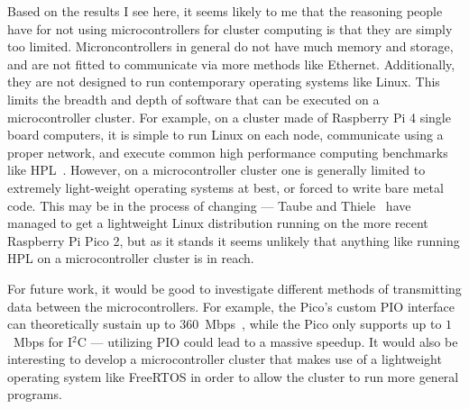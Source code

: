 \documentclass[conference]{IEEEtran}
\begin{document}
Based on the results I see here, it seems likely to me that the reasoning people have for not using microcontrollers for cluster computing is that they are simply too limited. 
Microncontrollers in general do not have much memory and storage, and are not fitted to communicate via more methods like Ethernet.
Additionally, they are not designed to run contemporary operating systems like Linux.
This limits the breadth and depth of software that can be executed on a microcontroller cluster.
For example, on a cluster made of Raspberry Pi 4 single board computers, it is simple to run Linux on each node, communicate using a proper network, and execute common high performance computing benchmarks like HPL~\cite{petitet+:url17}.
However, on a microcontroller cluster one is generally limited to extremely light-weight operating systems at best, or forced to write bare metal code.
This may be in the process of changing --- Taube and Thiele~\cite{pico2:linux} have managed to get a lightweight Linux distribution running on the more recent Raspberry Pi Pico 2, but as it stands it seems unlikely that anything like running HPL on a microcontroller cluster is in reach.

For future work, it would be good to investigate different methods of transmitting data between the microcontrollers. 
For example, the Pico's custom PIO interface can theoretically sustain up to $360$~Mbps~\cite{2040docs:rpi}, while the Pico only supports up to $1$~Mbps for I$^2$C --- utilizing PIO could lead to a massive speedup.
It would also be interesting to develop a microcontroller cluster that makes use of a lightweight operating system like FreeRTOS in order to allow the cluster to run more general programs.





\end{document}

